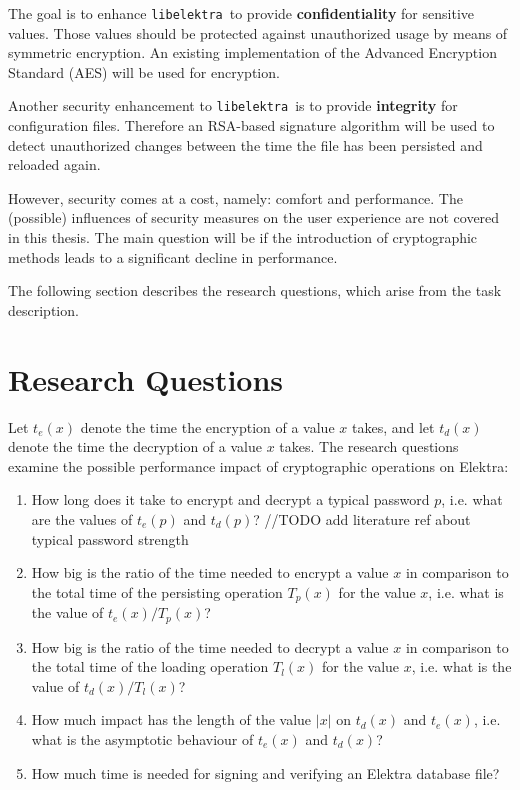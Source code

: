 \documentclass[a4paper,12pt]{article}
\newcommand{\libelektra}{\texttt{libelektra}~}
\begin{document}
The goal is to enhance \libelektra to provide \textbf{confidentiality} for sensitive values.
Those values should be protected against unauthorized usage by means of symmetric encryption.
An existing implementation of the Advanced Encryption Standard (AES) will be used for encryption.

Another security enhancement to \libelektra is to provide \textbf{integrity} for configuration files.
Therefore an RSA-based signature algorithm will be used to detect unauthorized changes between the time the file has been persisted and reloaded again.

However, security comes at a cost, namely: comfort and performance. The (possible) influences of security measures on the user experience are not covered in this thesis. The main question will be if the introduction of cryptographic methods leads to a significant decline in performance.

The following section describes the research questions, which arise from the task description.


\section{Research Questions}

Let $t_e(x)$ denote the time the encryption of a value $x$ takes, and let $t_d(x)$ denote the time the decryption of a value $x$ takes.
The research questions examine the possible performance impact of cryptographic operations on Elektra:

\begin{enumerate}
\item How long does it take to encrypt and decrypt a typical password $p$, i.e. what are the values of $t_e(p)$ and $t_d(p)$? //TODO add literature ref about typical password strength
  
\item How big is the ratio of the time needed to encrypt a value $x$ in comparison to the total time of the persisting operation $T_p(x)$ for the value $x$, i.e. what is the value of $t_e(x)/T_p(x)$?
  
\item How big is the ratio of the time needed to decrypt a value $x$ in comparison to the total time of the loading operation $T_l(x)$ for the value $x$, i.e. what is the value of $t_d(x)/T_l(x)$?

\item How much impact has the length of the value $|x|$ on $t_d(x)$ and $t_e(x)$, i.e. what is the asymptotic behaviour of $t_e(x)$ and $t_d(x)$?

\item How much time is needed for signing and verifying an Elektra database file?
  
\end{enumerate}
\end{document}
